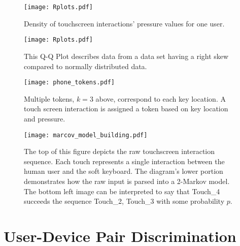 \begin{figure}
\centering
\texttt{[image: Rplots.pdf]}
\caption{
Density of touchscreen interactions' pressure values for one user.
}
\label{fig:normal_distribution}
\end{figure}

\begin{figure}
\centering
\texttt{[image: Rplots.pdf]}
\caption{
This Q-Q Plot describes data from
a data set having a right skew compared to normally distributed data.
}
\label{fig:qq_plot}
\end{figure}

\begin{figure}
\centering
\texttt{[image: phone\_tokens.pdf]}
\caption{
Multiple tokens, $k=3$ above, correspond to each key location.
A touch screen interaction is assigned a token based on
key location and pressure.
}
\label{fig:phone_tokens}
\end{figure}

\begin{figure}
\centering
\texttt{[image: marcov\_model\_building.pdf]}
\caption{
The top of this figure depicts the raw touchscreen interaction sequence.
Each touch represents a single interaction between the human user and the soft keyboard.
The diagram's lower portion demonstrates how the raw input is parsed into a 2-Markov model.
The bottom left image can be interpreted to say that Touch\_4 succeeds the sequence Touch\_2, Touch\_3 with some probability $p$.
}
\label{fig:markov_model_building}
\end{figure}

\section{User-Device Pair Discrimination}
\label{sec:differentiation}

